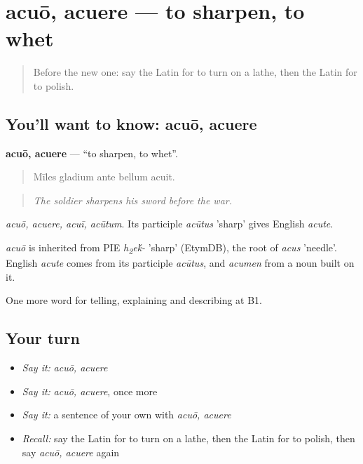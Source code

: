 \section[acuō, acuere]{acuō, acuere — to sharpen, to whet}

\label{lesson:LA-C471-acuo}



\begin{quote}
Before the new one: say the Latin for to turn on a lathe, then the Latin for to polish.
\end{quote}

\subsection*{You'll want to know: acuō, acuere}
\textbf{acuō, acuere} — \textquotedblleft{}to sharpen, to whet\textquotedblright{}.

\begin{quote}
Mīles gladium ante bellum acuit.
\end{quote}

\begin{quote}
\emph{The soldier sharpens his sword before the war.}
\end{quote}

\emph{acuō, acuere, acuī, acūtum}. Its participle \emph{acūtus} 'sharp' gives English \emph{acute}.

\begin{cousinweb}
\emph{acuō} is inherited from PIE \emph{h\textsubscript{2}e\'{k}-} 'sharp' (EtymDB), the root of \emph{acus} 'needle'. English \emph{acute} comes from its participle \emph{acūtus}, and \emph{acumen} from a noun built on it.
\end{cousinweb}

\begin{grammarlens}[title={What you've built}]
One more word for telling, explaining and describing at B1.
\end{grammarlens}

\subsection*{Your turn}
\begin{itemize}
\raggedright
  \item \emph{Say it:} \emph{acuō, acuere}
  \item \emph{Say it:} \emph{acuō, acuere}, once more
  \item \emph{Say it:} a sentence of your own with \emph{acuō, acuere}
  \item \emph{Recall:} say the Latin for to turn on a lathe, then the Latin for to polish, then say \emph{acuō, acuere} again
\end{itemize}

